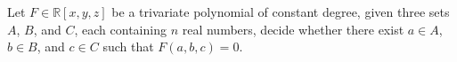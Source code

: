 \begin{problem}[3POL]
Let $F \in \mathbb{R}[x,y,z]$ be a trivariate polynomial of constant degree,
given three sets $A$, $B$, and $C$, each containing $n$ real numbers, decide
whether there exist $a \in A$, $b \in B$, and $c \in C$ such that
$F(a,b,c)=0$.
\end{problem}
